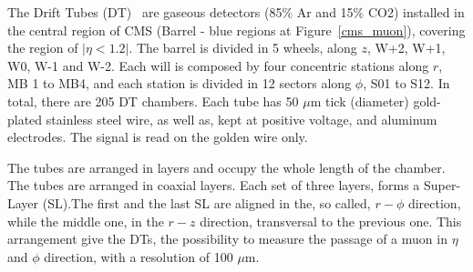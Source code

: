 The Drift Tubes (DT)~\cite{Teyssier:2015xjj} are gaseous detectors (85\% Ar and 15\% CO2) installed in the central region of CMS (Barrel - blue regions at Figure~\ref{cms_muon}), covering the region of $|\eta < 1.2|$. The barrel is divided in 5 wheels, along $z$, W+2, W+1, W0, W-1 and W-2. Each will is composed by four concentric stations along $r$, MB 1 to MB4, and each station is divided in 12 sectors along $\phi$, S01 to S12. In total, there are 205 DT chambers. Each tube has 50 $\mu$m tick (diameter) gold-plated stainless steel wire, as well as, kept at positive voltage, and aluminum electrodes. The signal is read on the golden wire only.

The tubes are arranged in layers and occupy the whole length of the chamber. The tubes are arranged in coaxial layers. Each set of three layers, forms a Super-Layer (SL).The first and the last SL are aligned in the, so called, $r-\phi$ direction, while the middle one, in the $r-z$ direction, transversal to the previous one. This arrangement give the DTs, the possibility to measure the passage of a muon in $\eta$ and $\phi$ direction, with a resolution of 100 $\mu$m.

